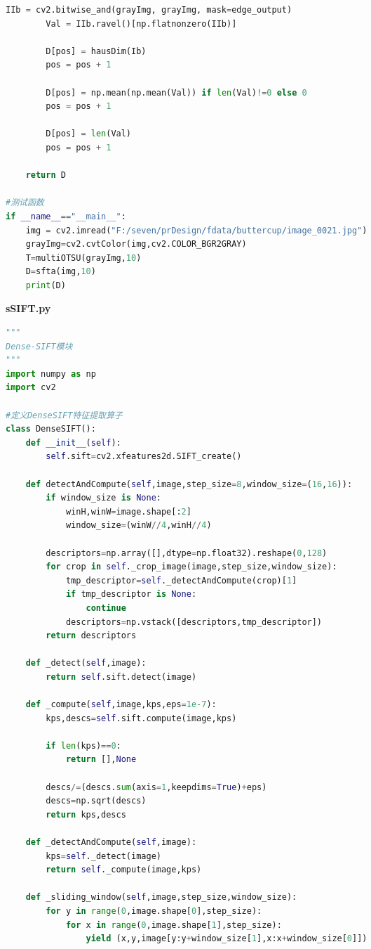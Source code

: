 \documentclass[supercite]{HustGraduPaper}
\begin{document}
\begin{sloppypar}
\begin{appendices}
\begin{spacing}{1.25}
\begin{lstlisting}[language=python]
        IIb = cv2.bitwise_and(grayImg, grayImg, mask=edge_output)
        Val = IIb.ravel()[np.flatnonzero(IIb)]

        D[pos] = hausDim(Ib)
        pos = pos + 1

        D[pos] = np.mean(np.mean(Val)) if len(Val)!=0 else 0
        pos = pos + 1

        D[pos] = len(Val)
        pos = pos + 1

    return D

#测试函数
if __name__=="__main__":
    img = cv2.imread("F:/seven/prDesign/fdata/buttercup/image_0021.jpg")
    grayImg=cv2.cvtColor(img,cv2.COLOR_BGR2GRAY)
    T=multiOTSU(grayImg,10)
    D=sfta(img,10)
    print(D)
  \end{lstlisting}
\end{spacing}
\textbf{sSIFT.py}
  \begin{spacing}{1.25}
  \begin{lstlisting}[language=python]
    """
Dense-SIFT模块
"""
import numpy as np
import cv2

#定义DenseSIFT特征提取算子
class DenseSIFT():
    def __init__(self):
        self.sift=cv2.xfeatures2d.SIFT_create()

    def detectAndCompute(self,image,step_size=8,window_size=(16,16)):
        if window_size is None:
            winH,winW=image.shape[:2]
            window_size=(winW//4,winH//4)

        descriptors=np.array([],dtype=np.float32).reshape(0,128)
        for crop in self._crop_image(image,step_size,window_size):
            tmp_descriptor=self._detectAndCompute(crop)[1]
            if tmp_descriptor is None:
                continue
            descriptors=np.vstack([descriptors,tmp_descriptor])
        return descriptors

    def _detect(self,image):
        return self.sift.detect(image)

    def _compute(self,image,kps,eps=1e-7):
        kps,descs=self.sift.compute(image,kps)

        if len(kps)==0:
            return [],None

        descs/=(descs.sum(axis=1,keepdims=True)+eps)
        descs=np.sqrt(descs)
        return kps,descs

    def _detectAndCompute(self,image):
        kps=self._detect(image)
        return self._compute(image,kps)

    def _sliding_window(self,image,step_size,window_size):
        for y in range(0,image.shape[0],step_size):
            for x in range(0,image.shape[1],step_size):
                yield (x,y,image[y:y+window_size[1],x:x+window_size[0]])


\end{lstlisting}
\end{spacing}
\end{appendices}
\end{sloppypar}
\end{document}
